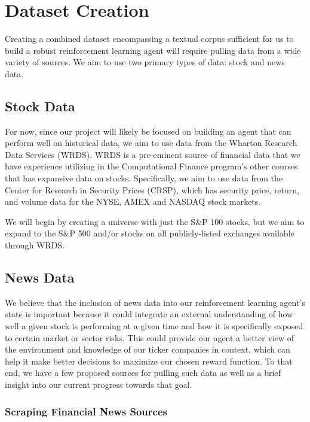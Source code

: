 \section{Dataset Creation}

Creating a combined dataset encompassing a textual corpus sufficient for us to build 
a robust reinforcement learning agent will require pulling data from a wide variety 
of sources. We aim to use two primary types of data: stock and news data.

\subsection{Stock Data}

For now, since our project will likely be focused on building an agent that can perform 
well on historical data, we aim to use data from the Wharton Research Data Services 
(WRDS). WRDS is a pre-eminent source of financial data that we have experience 
utilizing in the Computational Finance program’s other courses that has expansive 
data on stocks. Specifically, we aim to use data from the Center for Research in 
Security Prices (CRSP), which has security price, return, and volume data for the 
NYSE, AMEX and NASDAQ stock markets. 

We will begin by creating a universe with just the S$\&$P 100 stocks, but we aim to 
expand to the S$\&$P 500 and/or stocks on all publicly-listed exchanges available through WRDS.

\subsection{News Data}

We believe that the inclusion of news data into our reinforcement learning agent’s 
state is important because it could integrate an external understanding of how 
well a given stock is performing at a given time and how it is specifically 
exposed to certain market or sector risks. This could provide our agent a better 
view of the environment and knowledge of our ticker companies in context, which 
can help it make better decisions to maximize our chosen reward function. To that 
end, we have a few proposed sources for pulling such data as well as a brief insight 
into our current progress towards that goal.


\subsubsection{Scraping Financial News Sources}

